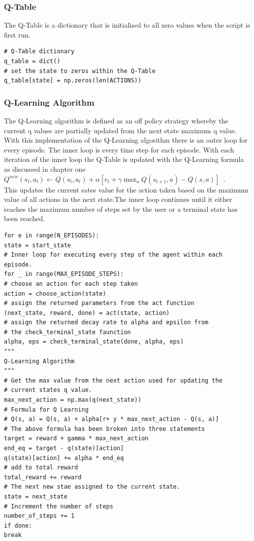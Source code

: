 \subsubsection{Q-Table}
The Q-Table is a dictionary that is initialised to all zero values when the script is first run.
\begin{verbatim}
# Q-Table dictionary
q_table = dict()
# set the state to zeros within the Q-Table
q_table[state] = np.zeros(len(ACTIONS))

\end{verbatim}
\subsubsection{Q-Learning Algorithm}
The Q-Learning algorithm is defined as an off policy strategy whereby the current q values are partially updated from the next state maximum q value.
With this implementation of the Q-Learning algorithm there is an outer loop for every episode.
The inner loop is every time step for each episode.
With each iteration of the inner loop the Q-Table is updated with the Q-Learning formula as discussed in chapter one\\
$Q^{new}(s_{t},a_{t})\leftarrow Q(s_{t},a_{t}) + \alpha[r_{t} + \gamma  \max _{a}Q(s_{t+1},a) - Q(s, a)]$~\cite{Qlearnin52:online}.\\ This updates the current sates value for the action taken based on the maximum value of all actions in the next state.The inner loop continues until it either reaches the maximum number of steps set by the user or a terminal state has been reached.
\begin{verbatim}
for e in range(N_EPISODES):
state = start_state
# Inner loop for executing every step of the agent within each episode.
for _ in range(MAX_EPISODE_STEPS):
# choose an action for each step taken
action = choose_action(state)
# assign the returned parameters from the act function
(next_state, reward, done) = act(state, action)
# assign the returned decay rate to alpha and epsilon from
# the check_terminal_state faunction
alpha, eps = check_terminal_state(done, alpha, eps)
"""
Q-Learning Algorithm
"""
# Get the max value from the next action used for updating the
# current states q value.
max_next_action = np.max(q(next_state))
# Formula for Q Learning
# Q(s, a) = Q(s, a) + alpha[r+ y * max_next_action - Q(s, a)]
# The above formula has been broken into three statements
target = reward + gamma * max_next_action
end_eq = target - q(state)[action]
q(state)[action] += alpha * end_eq
# add to total reward
total_reward += reward
# The next new stae assigned to the current state.
state = next_state
# Increment the number of steps
number_of_steps += 1
if done:
break


\end{verbatim}
